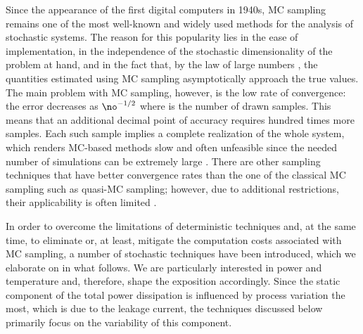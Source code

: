 Since the appearance of the first digital computers in 1940s, \acf{MC} sampling
remains one of the most well-known and widely used methods for the analysis of
stochastic systems. The reason for this popularity lies in the ease of
implementation, in the independence of the stochastic dimensionality of the
problem at hand, and in the fact that, by the law of large numbers
\cite{durrett2010}, the quantities estimated using \ac{MC} sampling
asymptotically approach the true values. The main problem with \ac{MC} sampling,
however, is the low rate of convergence: the error decreases as $\no^{-1/2}$
where \no is the number of drawn samples. This means that an additional decimal
point of accuracy requires hundred times more samples. Each such sample implies
a complete realization of the whole system, which renders \ac{MC}-based methods
slow and often unfeasible since the needed number of simulations can be
extremely large \cite{diaz-emparanza2002}. There are other sampling techniques
that have better convergence rates than the one of the classical \ac{MC}
sampling such as quasi-\ac{MC} sampling; however, due to additional
restrictions, their applicability is often limited \cite{xiu2010}.

In order to overcome the limitations of deterministic techniques and, at the
same time, to eliminate or, at least, mitigate the computation costs associated
with \ac{MC} sampling, a number of stochastic techniques have been introduced,
which we elaborate on in what follows. We are particularly interested in power
and temperature and, therefore, shape the exposition accordingly. Since the
static component of the total power dissipation is influenced by process
variation the most, which is due to the leakage current, the techniques
discussed below primarily focus on the variability of this component.

